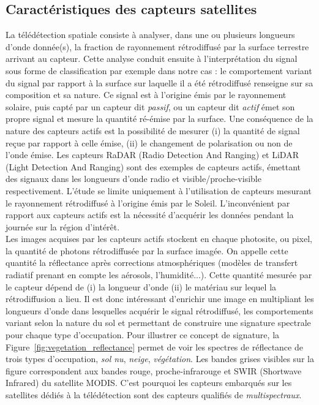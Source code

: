 \subsection{Caractéristiques des capteurs satellites}
La télédétection spatiale consiste à analyser, dans une ou plusieurs longueurs d'onde donnée(s), la fraction de rayonnement rétrodiffusé par la surface terrestre arrivant au capteur. Cette analyse conduit ensuite à l'interprétation du signal sous forme de classification par exemple dans notre cas : le comportement variant du signal par rapport à la surface  sur laquelle il a été rétrodiffusé renseigne sur sa composition et sa nature. Ce signal est à l'origine émis par le rayonnement solaire, puis capté par un capteur dit \textit{passif}, ou un capteur dit \textit{actif} émet son propre signal et mesure la quantité ré-émise par la surface. Une conséquence de la nature des capteurs actifs est la possibilité de mesurer (i) la quantité de signal reçue par rapport à celle émise, (ii) le changement de polarisation ou non de l'onde émise. Les capteurs RaDAR (Radio Detection And Ranging) et LiDAR (Light Detection And Ranging) sont des exemples de capteurs actifs, émettant des signaux dans les longueurs d'onde radio et visible/proche-visible respectivement. L'étude se limite uniquement à l'utilisation de capteurs mesurant le rayonnement rétrodiffusé à l'origine émis par le Soleil. L'inconvénient par rapport aux capteurs actifs est la nécessité d'acquérir les données pendant la journée sur la région d'intérêt.\\
Les images acquises par les capteurs actifs stockent en chaque photosite, ou pixel, la quantité de photons rétrodiffusée par la surface imagée. On appelle cette quantité la réflectance après corrections atmosphériques (modèles de transfert radiatif prenant en compte les aérosols, l'humidité...). Cette quantité mesurée par le capteur dépend de (i) la longueur d'onde (ii) le matériau sur lequel la rétrodiffusion a lieu. Il est donc intéressant d'enrichir une image en multipliant les longueurs d'onde dans lesquelles acquérir le signal rétrodiffusé, les comportements variant selon la nature du sol et permettant de construire une signature spectrale pour chaque type d'occupation. Pour illustrer ce concept de signature, la Figure~\ref{fig:vegetation_reflectance} permet de voir les spectres de réflectance de trois types d'occupation, \textit{sol nu}, \textit{neige}, \textit{végétation}. Les bandes grises visibles sur la figure correspondent aux bandes rouge, proche-infrarouge et SWIR (Shortwave Infrared) du satellite MODIS. C'est pourquoi les capteurs embarqués sur les satellites dédiés à la télédétection sont des capteurs qualifiés de \textit{multispectraux}.\\

